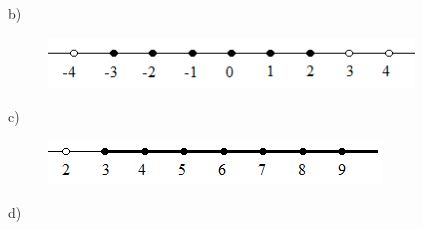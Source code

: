 \documentclass[12pt]{article}
\renewcommand{\_}{\kern-1.5pt\textunderscore\kern-1.5pt}
\begin{document}

\setlength{\parskip}{9.96pt}
\par

\begin{adjustwidth}{0.3in}{0.0in}
 b)\par

\end{adjustwidth}




\begin{figure}[H]
	\begin{Center}
		\includegraphics[width=3.83in,height=0.53in]{./media/image18.png}
	\end{Center}
\end{figure}



\par

\begin{adjustwidth}{0.3in}{0.0in}
 c)\par

\end{adjustwidth}




\begin{figure}[H]
	\begin{Center}
		\includegraphics[width=3.49in,height=0.46in]{./media/image19.png}
	\end{Center}
\end{figure}



\par

\begin{adjustwidth}{0.3in}{0.0in}
 d)\par

\end{adjustwidth}
\end{document}
